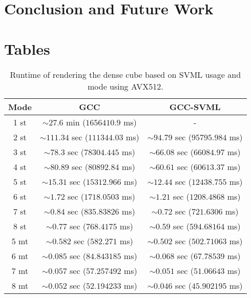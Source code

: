 \documentclass[a4paper, 11pt]{memoir}
\begin{document}
    \chapter{Conclusion and Future Work}

    \appendix
    \chapter{Tables}
    \begin{table}[H]
        \centering
        \begin{tabular}{|c | c | c|}
            \hline
            Mode & GCC                               & GCC-SVML\\\hline
            1 st & $\sim27.6$ min ($1656410.9$ ms)     & -\\
            2 st & $\sim111.34$ sec ($111344.03$ ms) & $\sim94.79$ sec ($95795.984$ ms)\\
            3 st & $\sim78.3$ sec ($78304.445$ ms)   & $\sim66.08$ sec ($66084.97$ ms)\\
            4 st & $\sim80.89$ sec ($80892.84$ ms)   & $\sim60.61$ sec ($60613.37$ ms)\\
            5 st & $\sim15.31$ sec ($15312.966$ ms)  & $\sim12.44$ sec ($12438.755$ ms)\\
            6 st & $\sim1.72$ sec ($1718.0503$ ms)   & $\sim1.21$ sec ($1208.4868$ ms)\\
            7 st & $\sim0.84$ sec ($835.83826$ ms)   & $\sim0.72$ sec ($721.6306$ ms)\\
            8 st & $\sim0.77$ sec ($768.4175$ ms)    & $\sim0.59$ sec ($594.68164$ ms)\\\hline\hline
            5 mt & $\sim0.582$ sec ($582.271$ ms)    & $\sim0.502$ sec ($502.71063$ ms)\\
            6 mt & $\sim0.085$ sec ($84.843185$ ms)  & $\sim0.068$ sec ($67.78539$ ms)\\
            7 mt & $\sim0.057$ sec ($57.257492$ ms)  & $\sim0.051$ sec ($51.06643$ ms)\\
            8 mt & $\sim0.052$ sec ($52.194233$ ms)  & $\sim0.046$ sec ($45.902195$ ms)\\
            \hline
        \end{tabular}
        \caption{Runtime of rendering the dense cube based on SVML usage and mode using AVX512.}
        \label{tab:perf_dense_cube_avx512_gcc}
    \end{table}
\end{document}
